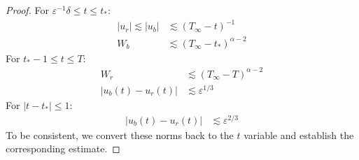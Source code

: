 \documentclass[letterpaper,11pt]{article}
\newcommand{\rmO}{\mathcal{O}}
\newcommand{\eps}{\varepsilon}
\newcommand{\lar}{ \lesssim }
\numberwithin{equation}{section}
\theoremstyle{plain}
\begin{document}
\begin{itemize}
\begin{proof}
For $\eps^{-1}\delta \le t \le t_*$:
\begin{align*}
|u_r| \lar |u_b| &\lar (T_\infty - t)^{-1} \\
W_b &\lar (T_\infty-t_*)^{\alpha-2}
\end{align*}
For $t_*-1\le t \le T$:
\begin{align*}
W_r &\lar (T_\infty-T)^{\alpha-2}\\
|u_b(t)-u_r(t)| &\lar \eps^{1/3}
\end{align*}
For $|t-t_*|\le 1$:
\begin{align*}
|u_b(t)-u_r(t)| &\lar \eps^{2/3}
\end{align*}
To be consistent, we convert these norms back to the $t$ variable and establish the corresponding estimate.
\end{proof}
\iffalse
\[ 
e^{-\xi}u_+^3 \sim e^{2\xi}
\]

\[
\mu(t)=\Omega_0\eps^{2/3} +(\delta-\delta^{-1})\eps^{5/6}-\eps e^{-\xi}
\]
\[
\eps e^{-2\xi} \le \eps\delta^2\eps^{-1/3} \le \delta^2\eps^{2/3}  \implies |\eps e^{-\xi}\mu| =\rmO(\eps^{2/3})
\]


e^{-(2-\eta)\xi} e^{-\xi}\mu &=e^{-(3-\eta)\xi} (\Omega_0 \eps^{2/3} + (\delta-\delta^{-1})\eps^{5/6}-\eps e^{-\xi} )\\
& \le e^{-(3-\eta)\xi} (\eps^{2/3}+\eps^{5/6}+\eps e^{-\xi}) \le  \\
&\sim \delta^{3-\eta}\eps^{\frac{\eta+1}{6}}
\end{align*}



\[
\sup_{0\ge \xi\ge \xi_*} e^{-(2-\eta)\xi}|e^{-\xi}w^2| \le \|w\|\sup |e^{-\xi}w| \le \|w\| e^{-\xi}e^{(2-\eta)\xi} =\|w\|e^{(1-\eta)\xi}
\]
\[
\sup_{0\ge \xi\ge \xi_*} e^{-(2-\eta)\xi}|e^{-\xi}u_+w^2|\le \|w\| \sup |e^{-\xi}w u_+| \le \|w\|e^{(2-\eta)\xi}
\]
\[
\sup_{0\ge \xi\ge \xi_*} |e^{-(2-\eta)\xi}e^{-\xi}w^3| \le \|w\|\sup_{\xi \ge \xi_*} |e^{-\xi} w^2| \le \|w\| e^{-\xi}e^{(4-2\eta)\xi}
\]

\[
\sup_{0\ge \xi\ge \xi_*} e^{-(2-\eta)\xi}|e^{-\xi}u_+^2w| \le \|w\| \sup |e^{\xi}u_+^2| \le \|w\|e^{(1-\eta)\xi}
\]

\fi

\end{itemize}
\pagebreak
\end{document}
